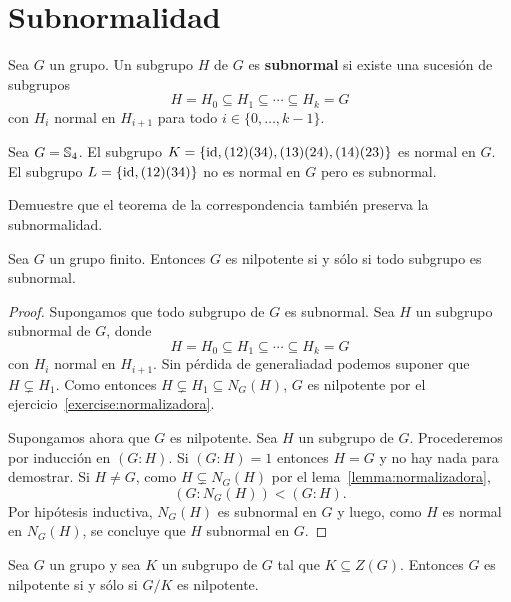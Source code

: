 \chapter{Subnormalidad}

\begin{definition}
	Sea $G$ un grupo. Un subgrupo $H$ de $G$ es \textbf{subnormal} si existe
	una sucesión de subgrupos 
	\[
		H=H_0\subseteq H_1\subseteq\cdots\subseteq H_k=G		
	\]
	con $H_i$ normal en $H_{i+1}$ para todo $i\in\{0,\dots,k-1\}$. 
\end{definition}

\begin{example}
	Sea $G=\mathbb{S}_4$. El subgrupo $K=\{\operatorname{id},(12)(34),(13)(24),(14)(23)\}$ es
	normal en $G$.  El subgrupo $L=\{\operatorname{id},(12)(34)\}$ no es normal en $G$ pero
	es subnormal. 
\end{example}

\begin{exercise}
	Demuestre que el teorema de la correspondencia también preserva la
	subnormalidad.
\end{exercise}

\begin{theorem}
	\label{theorem:subnormal}
	Sea $G$ un grupo finito. Entonces $G$ es nilpotente si y sólo si todo
	subgrupo es subnormal.
\end{theorem}

\begin{proof}
	Supongamos que todo subgrupo de $G$ es subnormal. Sea $H$ un subgrupo
	subnormal de $G$, donde 
	\[
		H=H_0\subseteq H_1\subseteq\cdots\subseteq H_k=G
	\]
	con $H_i$ normal en $H_{i+1}$. Sin pérdida de generaliadad podemos suponer
	que $H\subsetneq H_1$. Como entonces $H\subsetneq H_1\subseteq N_G(H)$, 
	$G$ es nilpotente por el ejercicio~\ref{exercise:normalizadora}.

	Supongamos ahora que $G$ es nilpotente. Sea $H$ un subgrupo de $G$.
	Procederemos por inducción en $(G:H)$. Si $(G:H)=1$ entonces $H=G$ y no hay
	nada para demostrar. Si $H\ne G$, como $H\subsetneq N_G(H)$ por el
	lema~\ref{lemma:normalizadora}, 
	\[
		(G:N_G(H))<(G:H).
	\]
	Por hipótesis inductiva, $N_G(H)$ es subnormal en $G$ y luego, como $H$ es
	normal en $N_G(H)$, se concluye que $H$ subnormal en $G$.
\end{proof}

\begin{corollary}
	Sea $G$ un grupo y sea $K$ un subgrupo de $G$ tal que $K\subseteq Z(G)$.
	Entonces $G$ es nilpotente si y sólo si $G/K$ es nilpotente. 
\end{corollary}

